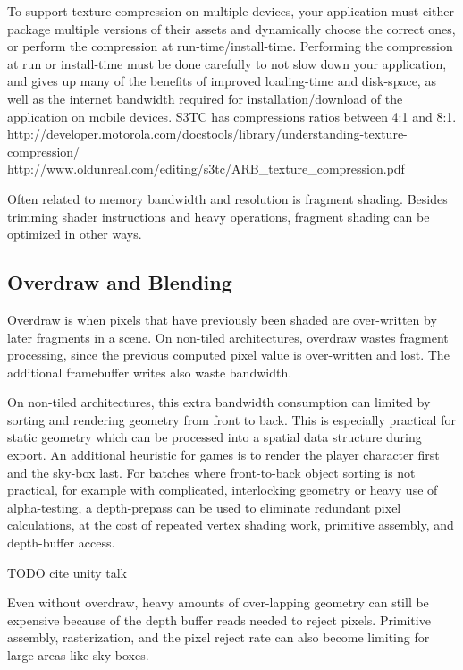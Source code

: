 To support texture compression on multiple devices, your application must
either package multiple versions of their assets and dynamically choose the
correct ones, or perform the compression at run-time/install-time.  Performing
the compression at run or install-time must be done carefully to not slow down
your application, and gives up many of the benefits of improved loading-time
and disk-space, as well as the internet bandwidth required for
installation/download of the application on mobile devices.  S3TC has
compressions ratios between 4:1 and 8:1.
http://developer.motorola.com/docstools/library/understanding-texture-compression/
http://www.oldunreal.com/editing/s3tc/ARB_texture_compression.pdf


Often related to memory bandwidth and resolution is fragment shading.  Besides trimming shader instructions and heavy operations, fragment shading can be optimized in other ways.

\subsection{Overdraw and Blending}
Overdraw is when pixels that have previously been shaded are over-written by later fragments in a scene.  On non-tiled architectures, overdraw wastes fragment processing, since the previous computed pixel value is over-written and lost.  The additional framebuffer writes also waste bandwidth.

On non-tiled architectures, this extra bandwidth consumption can limited by
sorting and rendering geometry from front to back.  This is especially
practical for static geometry which can be processed into a spatial data
structure during export.  An additional heuristic for games is to render the
player character first and the sky-box last.  For batches where front-to-back
object sorting is not practical, for example with complicated, interlocking
geometry or heavy use of alpha-testing, a depth-prepass can be used to
eliminate redundant pixel calculations, at the cost of repeated vertex shading
work, primitive assembly, and depth-buffer access.

TODO cite unity talk

Even without overdraw, heavy amounts of over-lapping geometry can still be expensive because of the depth buffer reads needed to reject pixels.  Primitive assembly, rasterization, and the pixel reject rate can also become limiting for large areas like sky-boxes.

